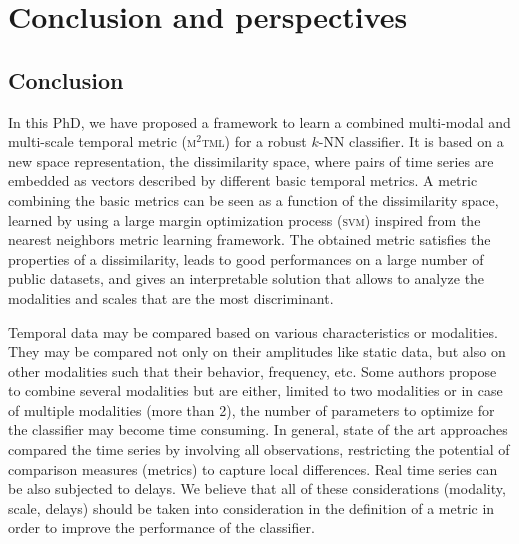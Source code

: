\chapter*{Conclusion and perspectives}
\label{sec:conclusion}

\section*{Conclusion}
In this PhD, we have proposed a framework to learn a combined multi-modal and multi-scale temporal metric (\textsc{m$^2$tml}) for a robust $k$-NN classifier. It is based on a new space representation, the dissimilarity space, where pairs of time series are embedded as vectors described by different basic temporal metrics. A metric combining the basic metrics can be seen as a function of the dissimilarity space, learned by using a large margin optimization process (\textsc{svm}) inspired from the nearest neighbors metric learning framework. The obtained metric satisfies the properties of a dissimilarity, leads to good performances on a large number of public datasets, and gives an interpretable solution that allows to analyze the modalities and scales that are the most discriminant.

Temporal data may be compared based on various characteristics or modalities. They may be compared not only on their amplitudes like static data, but also on other modalities such that their behavior, frequency, etc. Some authors propose to combine several modalities but are either, limited to two modalities or in case of multiple modalities (more than 2), the number of parameters to optimize for the classifier may become time consuming. In general, state of the art approaches compared the time series by involving all observations, restricting the potential of comparison measures (metrics) to capture local differences. Real time series can be also subjected to delays. We believe that all of these considerations (modality, scale, delays) should be taken into consideration in the definition of a metric in order to improve the performance of the classifier.

